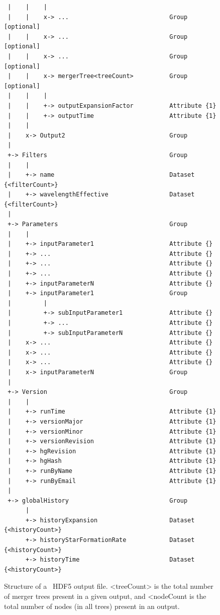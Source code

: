 \begin{figure}
\begin{center}
\begin{verbatim}
 |    |    |
 |    |    x-> ...                            Group              [optional]
 |    |    x-> ...                            Group              [optional]
 |    |    x-> ...                            Group              [optional]
 |    |    x-> mergerTree<treeCount>          Group              [optional]
 |    |    |
 |    |    +-> outputExpansionFactor          Attribute {1}
 |    |    +-> outputTime                     Attribute {1}
 |    |
 |    x-> Output2                             Group
 |
 +-> Filters                                  Group
 |    |
 |    +-> name                                Dataset   {<filterCount>}
 |    +-> wavelengthEffective                 Dataset   {<filterCount>}
 |
 +-> Parameters                               Group
 |    |
 |    +-> inputParameter1                     Attribute {}
 |    +-> ...                                 Attribute {}
 |    +-> ...                                 Attribute {}
 |    +-> ...                                 Attribute {}
 |    +-> inputParameterN                     Attribute {}
 |    +-> inputParameter1                     Group
 |         |
 |         +-> subInputParameter1             Attribute {}
 |         +-> ...                            Attribute {}
 |         +-> subInputParameterN             Attribute {}
 |    x-> ...                                 Attribute {}
 |    x-> ...                                 Attribute {}
 |    x-> ...                                 Attribute {}
 |    x-> inputParameterN                     Group
 |
 +-> Version                                  Group
 |    |
 |    +-> runTime                             Attribute {1}
 |    +-> versionMajor                        Attribute {1}
 |    +-> versionMinor                        Attribute {1}
 |    +-> versionRevision                     Attribute {1}
 |    +-> hgRevision                          Attribute {1}
 |    +-> hgHash                              Attribute {1}
 |    +-> runByName                           Attribute {1}
 |    +-> runByEmail                          Attribute {1}
 |
 +-> globalHistory                            Group
      |
      +-> historyExpansion                    Dataset {<historyCount>}
      +-> historyStarFormationRate            Dataset {<historyCount>}
      +-> historyTime                         Dataset {<historyCount>}
\end{verbatim}
\end{center}
\caption{Structure of a \glc\ HDF5 output file. {\normalfont \ttfamily <treeCount>} is the total number of merger trees present in a given output, and {\normalfont \ttfamily <nodeCount} is the total number of nodes (in all trees) present in an output.}
\label{fig:glcOutputFileStructure}
\end{figure}

